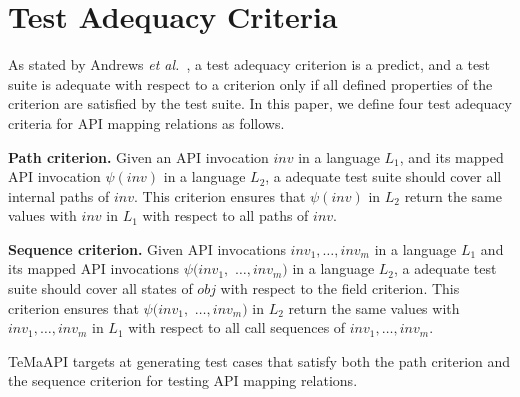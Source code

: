 \section{Test Adequacy Criteria}
\label{sec:mapping}
As stated by Andrews \emph{et al.}~\cite{andrews2003test}, a test adequacy criterion is a predict, and a test suite is adequate with respect to a criterion only if all defined properties of the criterion are satisfied by the test suite. In this paper, we define four test adequacy criteria for API mapping relations as follows.

\textbf{Path criterion.} Given an API invocation $inv$ in a language $L_1$, and its mapped API invocation $\psi(inv)$ in a language $L_2$, a adequate test suite should cover all internal paths of $inv$. This criterion ensures that  $\psi(inv)$ in $L_2$ return the same values with $inv$ in $L_1$ with respect to all paths of $inv$.

\textbf{Sequence criterion.} Given API invocations $inv_{1},\ldots,inv_{m}$ in a language $L_1$ and its mapped API invocations $\psi(inv_{1},$ $\ldots,inv_{m})$ in a language $L_2$, a adequate test suite should cover all states of $obj$ with respect to the field criterion. This criterion ensures that  $\psi(inv_{1},$ $\ldots,inv_{m})$ in $L_2$ return the same values with $inv_{1},\ldots,inv_{m}$ in $L_1$ with respect to all call sequences of $inv_{1},\ldots,inv_{m}$.

TeMaAPI targets at generating test cases that satisfy both the path criterion and the sequence criterion for testing API mapping relations.
